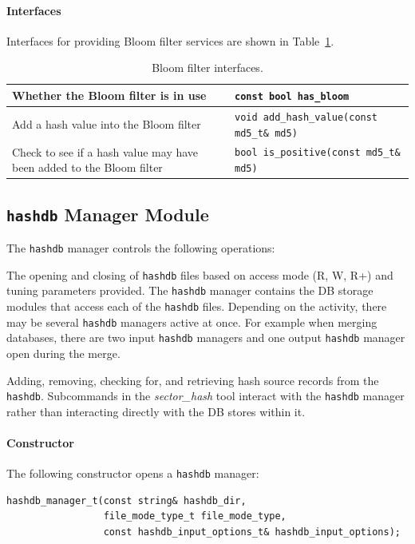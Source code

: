 \documentclass[10pt,twoside]{article}
\newcommand{\sh}{\emph{sector\_hash}\xspace}
\newcommand{\hdb}{\texttt{hashdb}\xspace}
\begin{document}
\paragraph{Interfaces}
Interfaces for providing Bloom filter services
are shown in Table~\ref{bloom-filter-interfaces}.
\begin{table}[h]
\center
\begin{tabular}{|p{2in}|p{4in}|}
\hline
Whether the Bloom filter is in use &\texttt{const bool has\_bloom} \\
\hline
Add a hash value into the Bloom filter & \texttt{void add\_hash\_value(const md5\_t\& md5)} \\
\hline
Check to see if a hash value may have been added to the Bloom filter & \texttt{bool is\_positive(const md5\_t\& md5)} \\
\hline
\end{tabular}
\caption{Bloom filter interfaces.\label{bloom-filter-interfaces}}
\end{table}

\subsection{\hdb Manager Module\label{hashdb-manager}}
The \hdb manager controls the following operations:
\begin{compactitem}
\item The opening and closing of \hdb files
based on access mode (R, W, R+) and tuning parameters provided.
The \hdb manager contains the DB storage modules that access each of the \hdb files.
Depending on the activity, there may be several \hdb managers active at once.
For example when merging databases, there are two input \hdb managers
and one output \hdb manager open during the merge.
\item Adding, removing, checking for,
and retrieving hash source records from the \hdb.
Subcommands in the \sh tool interact with the \hdb manager
rather than interacting directly with the DB stores within it.

\end{compactitem}
\paragraph{Constructor}
The following constructor opens a \hdb manager:
\begin{small}
\begin{verbatim}
hashdb_manager_t(const string& hashdb_dir,
                 file_mode_type_t file_mode_type,
                 const hashdb_input_options_t& hashdb_input_options);
\end{verbatim}
\end{small}
\end{document}
